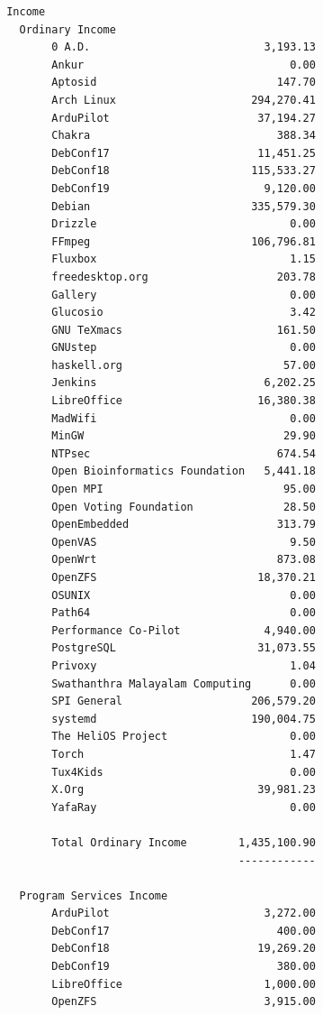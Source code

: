 \documentclass[a4paper]{report}
\begin{document}
\begin{verbatim}
 Income
   Ordinary Income
        0 A.D.                           3,193.13
        Ankur                                0.00
        Aptosid                            147.70
        Arch Linux                     294,270.41
        ArduPilot                       37,194.27
        Chakra                             388.34
        DebConf17                       11,451.25
        DebConf18                      115,533.27
        DebConf19                        9,120.00
        Debian                         335,579.30
        Drizzle                              0.00
        FFmpeg                         106,796.81
        Fluxbox                              1.15
        freedesktop.org                    203.78
        Gallery                              0.00
        Glucosio                             3.42
        GNU TeXmacs                        161.50
        GNUstep                              0.00
        haskell.org                         57.00
        Jenkins                          6,202.25
        LibreOffice                     16,380.38
        MadWifi                              0.00
        MinGW                               29.90
        NTPsec                             674.54
        Open Bioinformatics Foundation   5,441.18
        Open MPI                            95.00
        Open Voting Foundation              28.50
        OpenEmbedded                       313.79
        OpenVAS                              9.50
        OpenWrt                            873.08
        OpenZFS                         18,370.21
        OSUNIX                               0.00
        Path64                               0.00
        Performance Co-Pilot             4,940.00
        PostgreSQL                      31,073.55
        Privoxy                              1.04
        Swathanthra Malayalam Computing      0.00
        SPI General                    206,579.20
        systemd                        190,004.75
        The HeliOS Project                   0.00
        Torch                                1.47
        Tux4Kids                             0.00
        X.Org                           39,981.23
        YafaRay                              0.00

        Total Ordinary Income        1,435,100.90
                                     ------------

   Program Services Income
        ArduPilot                        3,272.00
        DebConf17                          400.00
        DebConf18                       19,269.20
        DebConf19                          380.00
        LibreOffice                      1,000.00
        OpenZFS                          3,915.00


\end{verbatim}
\end{document}
